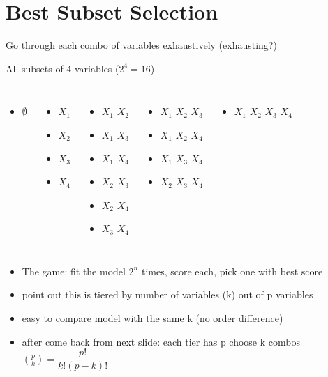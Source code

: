 \documentclass[aspectratio=169,usenames,dvipsnames]{beamer}
\newcommand{\InstructorList}[1]{
\begin{itemize}
	\color{orange}
	#1
\end{itemize}
}
\begin{document}
\section{Best Subset Selection}
\begin{frame}[c]{Go through each combo of variables exhaustively (exhausting?)}

	\centering
All subsets of 4 variables ($2^4 = 16$)

\begin{columns}
\centering
\begin{itemize}
	\item $\emptyset$
\end{itemize}
\centering

\begin{itemize}
	\item $X_1$
	\item $X_2$
	\item $X_3$
	\item $X_4$
\end{itemize}
\centering
\begin{itemize}
	\item $X_1$ $X_2$
	\item $X_1$ $X_3$
	\item $X_1$ $X_4$
	\item $X_2$ $X_3$
	\item $X_2$ $X_4$
	\item $X_3$ $X_4$
\end{itemize}
\centering
\begin{itemize}
	\item $X_1$ $X_2$ $X_3$
	\item $X_1$ $X_2$ $X_4$
	\item $X_1$ $X_3$ $X_4$
	\item $X_2$ $X_3$ $X_4$
\end{itemize}
\centering
\begin{itemize}
	\item $X_1$ $X_2$ $X_3$ $X_4$
\end{itemize}
\end{columns}

\InstructorList{
	\item The game: fit the model $2^n$ times, score each, pick one with best score
	\item point out this is tiered by number of variables (k) out of p variables
	\item easy to compare model with the same k (no order difference) 
	\item after come back from next slide: each tier has p choose k combos $\binom{p}{k} = \dfrac{p!}{k!(p-k)!}$
}
\end{frame}
\end{document}
